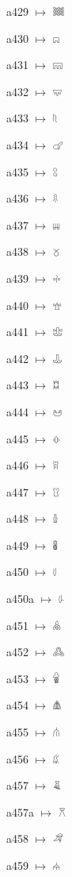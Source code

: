 {\noindent a429 $\mapsto$ {\ahfont 𔗢}\par
\noindent a430 $\mapsto$ {\ahfont 𔗣}\par
\noindent a431 $\mapsto$ {\ahfont 𔗤}\par
\noindent a432 $\mapsto$ {\ahfont 𔗥}\par
\noindent a433 $\mapsto$ {\ahfont 𔗦}\par
\noindent a434 $\mapsto$ {\ahfont 𔗧}\par
\noindent a435 $\mapsto$ {\ahfont 𔗨}\par
\noindent a436 $\mapsto$ {\ahfont 𔗩}\par
\noindent a437 $\mapsto$ {\ahfont 𔗪}\par
\noindent a438 $\mapsto$ {\ahfont 𔗫}\par
\noindent a439 $\mapsto$ {\ahfont 𔗬}\par
\noindent a440 $\mapsto$ {\ahfont 𔗭}\par
\noindent a441 $\mapsto$ {\ahfont 𔗮}\par
\noindent a442 $\mapsto$ {\ahfont 𔗯}\par
\noindent a443 $\mapsto$ {\ahfont 𔗰}\par
\noindent a444 $\mapsto$ {\ahfont 𔗱}\par
\noindent a445 $\mapsto$ {\ahfont 𔗲}\par
\noindent a446 $\mapsto$ {\ahfont 𔗳}\par
\noindent a447 $\mapsto$ {\ahfont 𔗴}\par
\noindent a448 $\mapsto$ {\ahfont 𔗵}\par
\noindent a449 $\mapsto$ {\ahfont 𔗶}\par
\noindent a450 $\mapsto$ {\ahfont 𔗷}\par
\noindent a450a $\mapsto$ {\ahfont 𔗸}\par
\noindent a451 $\mapsto$ {\ahfont 𔗹}\par
\noindent a452 $\mapsto$ {\ahfont 𔗺}\par
\noindent a453 $\mapsto$ {\ahfont 𔗻}\par
\noindent a454 $\mapsto$ {\ahfont 𔗼}\par
\noindent a455 $\mapsto$ {\ahfont 𔗽}\par
\noindent a456 $\mapsto$ {\ahfont 𔗾}\par
\noindent a457 $\mapsto$ {\ahfont 𔗿}\par
\noindent a457a $\mapsto$ {\ahfont 𔘀}\par
\noindent a458 $\mapsto$ {\ahfont 𔘁}\par
\noindent a459 $\mapsto$ {\ahfont 𔘂}\par
}
